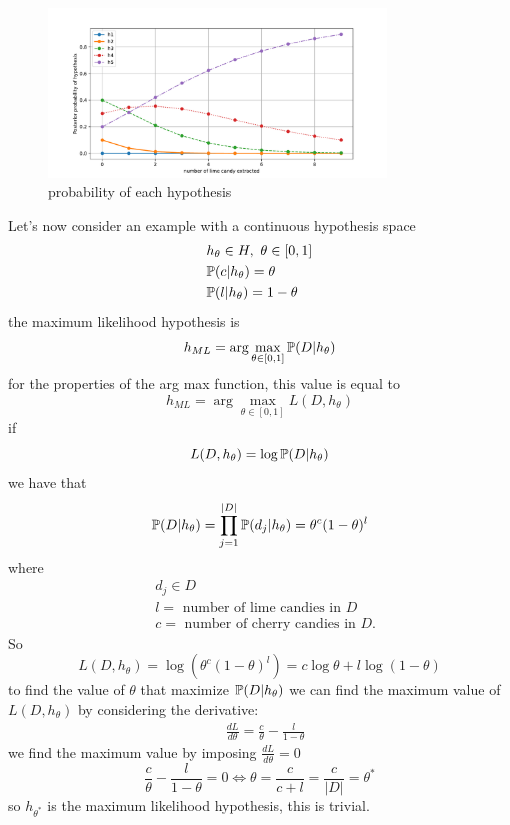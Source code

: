 \documentclass[10pt, letterpaper]{report}
\begin{document}
\begin{figure}[h!]
    \centering
    \includegraphics[width=0.8\textwidth]{images/candy_graph.pdf}
    \caption{probability of each hypothesis}
    \label{img:candy_graph}
\end{figure}
\noindent
Let's now consider an example with a continuous hypothesis space\begin{align}
    &h_\theta\in H, \ \theta\in[0,1]\\
    &{\mathbb P}(c|h_\theta)=\theta\\
    &{\mathbb P}(l|h_\theta)=1-\theta
\end{align}
the maximum likelihood hypothesis is\begin{equation}
    h_{ML}=\arg\max_{\theta\in[0,1]}{\mathbb P}(D|h_\theta)
\end{equation}
for the properties of the arg max function, this value is equal to
\begin{equation}
    h_{ML}=\arg\max_{\theta\in[0,1]}L(D,h_\theta)
\end{equation}
if \begin{equation}
    L(D,h_\theta)=\log{\mathbb P}(D|h_\theta)
\end{equation}
we have that\begin{equation}
    {\mathbb P}(D|h_{\theta})=\prod_{j=1}^{|D|}{\mathbb P}(d_j|h_\theta)=\theta^c(1-\theta)^l
\end{equation}
where\begin{align*}
    &d_j\in D\\
    &l = \text{ number of lime candies in }D\\
    &c = \text{ number of cherry candies in }D.
\end{align*}
So\begin{equation}
    L(D,h_\theta)=\log(\theta^c(1-\theta)^l)=c\log\theta+l\log(1-\theta)
\end{equation}
to find the value of $\theta$ that maximize ${\mathbb P}(D|h_\theta)$ we can find the maximum value of $ L(D,h_\theta)$ by considering the derivative:\begin{align*}
    &\frac{dL}{d\theta}=\frac{c}{\theta}-\frac{l}{1-\theta}
\end{align*}
we find the maximum value by imposing $\frac{dL}{d\theta}=0$\begin{equation}
    \frac{c}{\theta}-\frac{l}{1-\theta}=0\iff \theta=\frac{c}{c+l}=\frac{c}{|D|}=\theta^*
\end{equation}
so $h_{\theta^*}$ is the maximum likelihood hypothesis, this is trivial.\bigskip
\end{document}
